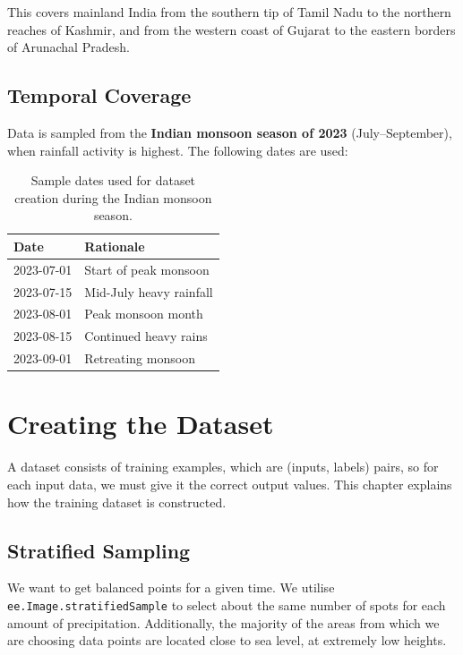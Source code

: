 \documentclass[12pt, a4paper]{report}
\begin{document}
This covers mainland India from the southern tip of Tamil Nadu to the northern reaches of Kashmir, and from the western coast of Gujarat to the eastern borders of Arunachal Pradesh.

\section{Temporal Coverage}

Data is sampled from the \textbf{Indian monsoon season of 2023} (July--September), when rainfall activity is highest. The following dates are used:

\begin{table}[H]
\centering
\begin{tabular}{@{}ll@{}}
\toprule
\textbf{Date} & \textbf{Rationale} \\
\midrule
2023-07-01 & Start of peak monsoon \\
2023-07-15 & Mid-July heavy rainfall \\
2023-08-01 & Peak monsoon month \\
2023-08-15 & Continued heavy rains \\
2023-09-01 & Retreating monsoon \\
\bottomrule
\end{tabular}
\caption{Sample dates used for dataset creation during the Indian monsoon season.}
\label{tab:dates}
\end{table}

\chapter{Creating the Dataset}

A dataset consists of training examples, which are (inputs, labels) pairs, so for each input data, we must give it the correct output values. This chapter explains how the training dataset is constructed.

\section{Stratified Sampling}

We want to get balanced points for a given time. We utilise \texttt{ee.Image.stratifiedSample} to select about the same number of spots for each amount of precipitation. Additionally, the majority of the areas from which we are choosing data points are located close to sea level, at extremely low heights.
\end{document}
